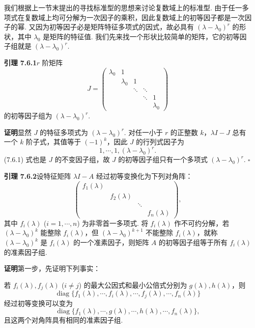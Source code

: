 \documentclass[UTF8, 12pt, fontset=fandol, oneside]{ctexart}
\begin{document}
我们根据上一节末提出的寻找标准型的思想来讨论复数域上的标准型. 由于任一多项式在复数域上均可分解为一次因子的乘积，因此复数域上的初等因子都是一次因子的幂. 又因为初等因子必是矩阵特征多项式的因式，故必具有 $(\lambda-\lambda_0)^r$ 的形状，其中 $\lambda_0$ 是矩阵的特征值. 我们先来找一个形状比较简单的矩阵，它的初等因子组就是 $(\lambda-\lambda_0)^r$.

\noindent\textbf{引理 7.6.1}\quad $r$ 阶矩阵
\[
J=\left(\begin{array}{ccccc}
\lambda_0 & 1 & & & \\
& \lambda_0 & 1 & & \\
& & \ddots & \ddots & \\
& & & \ddots & 1\\
& & & & \lambda_0
\end{array}\right)
\]
的初等因子组为 $(\lambda-\lambda_0)^r$.

\noindent\textbf{证明}\quad 显然 $J$ 的特征多项式为 $(\lambda-\lambda_0)^r$. 对任一小于 $r$ 的正整数 $k$，$\lambda I-J$ 总有一个 $k$ 阶子式，其值等于 $(-1)^k$，因此 $J$ 的行列式因子为
\begin{equation}
1,\cdots,1,(\lambda-\lambda_0)^r.
\tag{7.6.1}
\end{equation}
(7.6.1) 式也是 $J$ 的不变因子组，故 $J$ 的初等因子组只有一个多项式 $(\lambda-\lambda_0)^r$. $\square$

\noindent\textbf{引理 7.6.2}\quad 设特征矩阵 $\lambda I-A$ 经过初等变换化为下列对角阵：
\begin{equation}
\left(\begin{array}{cccc}
f_1(\lambda) & & & \\
& f_2(\lambda) & & \\
& & \ddots & \\
& & & f_n(\lambda)
\end{array}\right),
\tag{7.6.2}
\end{equation}
其中 $f_i(\lambda)$ ($i=1,\cdots,n$) 为非零首一多项式. 将 $f_i(\lambda)$ 作不可约分解，若 $(\lambda-\lambda_0)^k$ 能整除 $f_i(\lambda)$，但 $(\lambda-\lambda_0)^{k+1}$ 不能整除 $f_i(\lambda)$，就称 $(\lambda-\lambda_0)^k$ 是 $f_i(\lambda)$ 的一个准素因子，则矩阵 $A$ 的初等因子组等于所有 $f_i(\lambda)$ 的准素因子组.

\noindent\textbf{证明}\quad 第一步，先证明下列事实：

若 $f_i(\lambda),f_j(\lambda)$ ($i\neq j$) 的最大公因式和最小公倍式分别为 $g(\lambda),h(\lambda)$，则
\[
\operatorname{diag}\{f_1(\lambda),\cdots,f_i(\lambda),\cdots,f_j(\lambda),\cdots,f_n(\lambda)\}
\]
经过初等变换可以变为
\[
\operatorname{diag}\{f_1(\lambda),\cdots,g(\lambda),\cdots,h(\lambda),\cdots,f_n(\lambda)\},
\]
且这两个对角阵具有相同的准素因子组.
\end{document}

